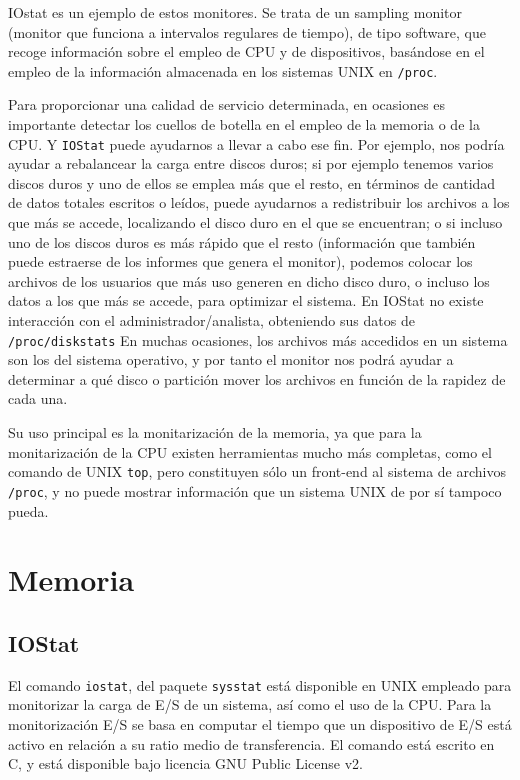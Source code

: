 \documentclass[a4paper,10pt]{article}
\begin{document}
IOstat es un ejemplo de estos monitores. Se trata de un sampling monitor (monitor que funciona a intervalos regulares de
tiempo), de tipo software, que recoge información sobre el empleo de CPU y de dispositivos, basándose en el empleo de la información almacenada
en los sistemas UNIX en \texttt{/proc}.

Para proporcionar una calidad de servicio determinada, en ocasiones es importante detectar los cuellos de botella en el empleo
de la memoria o de la CPU. Y \texttt{IOStat} puede ayudarnos a llevar a cabo ese fin. Por ejemplo, nos podría ayudar a rebalancear
la carga entre discos duros; si por ejemplo tenemos varios discos duros y uno de ellos se emplea más que el resto, en términos
de cantidad de datos totales escritos o leídos, puede ayudarnos a redistribuir los archivos a los que más se accede, localizando
el disco duro en el que se encuentran; o si incluso uno de los discos duros es más rápido que el resto (información que 
también puede estraerse de los informes que genera el monitor), podemos colocar los archivos de los usuarios que más uso generen en dicho
disco duro, o incluso los datos a los que más se accede, para optimizar el sistema. En IOStat no existe interacción con el 
administrador/analista, obteniendo sus datos de \texttt{/proc/diskstats}
En muchas ocasiones, los archivos más accedidos en un sistema son los del sistema operativo, y por tanto el monitor nos podrá
ayudar a determinar a qué disco o partición mover los archivos en función de la rapidez de cada una. \cite{merelo}

Su uso principal es la monitarización de la memoria, ya que para la monitarización de la CPU existen herramientas mucho más
completas, como el comando de UNIX \texttt{top}, pero constituyen sólo  un front-end al sistema de archivos \texttt{/proc}, y no
puede mostrar información que un sistema UNIX de por sí tampoco pueda. \cite{readme}

\section{Memoria}
\subsection{IOStat \cite{maniostat}}
El comando \texttt{iostat}, del paquete \texttt{sysstat} está disponible en UNIX empleado para monitorizar la carga de E/S de un sistema,
así como el uso de la CPU. Para la monitorización E/S se basa en computar el tiempo que un dispositivo de E/S está activo en 
relación a su ratio medio de transferencia. El comando está escrito en C, y está disponible bajo licencia GNU Public License v2.
\end{document}
